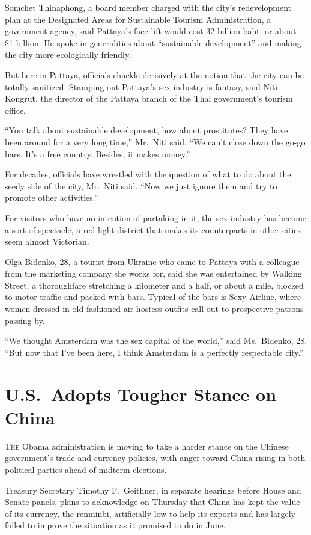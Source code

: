 ﻿\documentclass[12pt]{article}
\begin{document}
Somchet Thinaphong, a board member charged with the city's redevelopment plan at the Designated
Areas for Sustainable Tourism Administration, a government agency, said Pattaya's face-lift would
cost 32 billion baht, or about \$1 billion. He spoke in generalities about ``sustainable
development'' and making the city more ecologically friendly.

But here in Pattaya, officials chuckle derisively at the notion that the city can be totally
sanitized. Stamping out Pattaya's sex industry is fantasy, said Niti Kongrut, the director of the
Pattaya branch of the Thai government's tourism office.

``You talk about sustainable development, how about prostitutes? They have been around for a very
long time,'' Mr.~Niti said. ``We can't close down the go-go bars. It's a free country. Besides, it
makes money.''

For decades, officials have wrestled with the question of what to do about the seedy side of the
city, Mr.~Niti said. ``Now we just ignore them and try to promote other activities.''

For visitors who have no intention of partaking in it, the sex industry has become a sort of
spectacle, a red-light district that makes its counterparts in other cities seem almost Victorian.

Olga Bidenko, 28, a tourist from Ukraine who came to Pattaya with a colleague from the marketing
company she works for, said she was entertained by Walking Street, a thoroughfare stretching a
kilometer and a half, or about a mile, blocked to motor traffic and packed with bars. Typical of the
bars is Sexy Airline, where women dressed in old-fashioned air hostess outfits call out to
prospective patrons passing by.

``We thought Amsterdam was the sex capital of the world,'' said Ms.~Bidenko, 28. ``But now that I've
been here, I think Amsterdam is a perfectly respectable city.''

\pagebreak
\section{U.S.~Adopts Tougher Stance on China}

\lettrine{T}{he} Obama administration is moving to take a harder stance on
the Chinese government's trade and currency policies, with anger toward China rising in both
political parties ahead of midterm elections.

Treasury Secretary Timothy F.~Geithner, in separate hearings before House and Senate panels, plans
to acknowledge on Thursday that China has kept the value of its currency, the renminbi, artificially
low to help its exports and has largely failed to improve the situation as it promised to do in
June.
\end{document}
